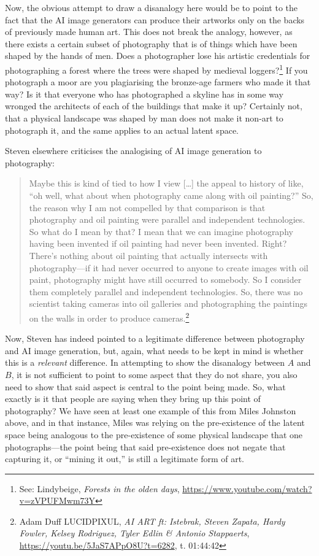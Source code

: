 \documentclass[11pt]{article}
\begin{document}
Now, the obvious attempt to draw a disanalogy here would be to point to the fact that the AI image generators can produce their artworks only on the backs of previously made human art. This does not break the analogy, however, as there exists a certain subset of photography that is of things which have been shaped by the hands of men. Does a photographer lose his artistic credentials for photographing a forest where the trees were shaped by medieval loggers?\footnote{See: Lindybeige, \emph{Forests in the olden days}, \url{https://www.youtube.com/watch?v=zVPUFMwm73Y}} If you photograph a moor are you plagiarising the bronze-age farmers who made it that way? Is it that everyone who has photographed a skyline has in some way wronged the architects of each of the buildings that make it up? Certainly not, that a physical landscape was shaped by man does not make it non-art to photograph it, and the same applies to an actual latent space.

Steven elsewhere criticises the analogising of AI image generation to photography:
\begin{quote}
Maybe this is kind of tied to how I view [\ldots{}] the appeal to history of like, ``oh well, what about when photography came along with oil painting?'' So, the reason why I am not compelled by that comparison is that photography and oil painting were parallel and independent technologies. So what do I mean by that? I mean that we can imagine photography having been invented if oil painting had never been invented. Right? There's nothing about oil painting that actually intersects with photography---if it had never occurred to anyone to create images with oil paint, photography might have still occurred to somebody. So I consider them completely parallel and independent technologies. So, there was no scientist taking cameras into oil galleries and photographing the paintings on the walls in order to produce cameras.\footnote{Adam Duff LUCIDPIXUL, \emph{AI ART ft: Istebrak, Steven Zapata, Hardy Fowler, Kelsey Rodriguez, Tyler Edlin \& Antonio Stappaerts}, \url{https://youtu.be/5JaS7APpO8U?t=6282}, t. 01:44:42}
\end{quote}

Now, Steven has indeed pointed to a legitimate difference between photography and AI image generation, but, again, what needs to be kept in mind is whether this is a \emph{relevant} difference. In attempting to show the disanalogy between \(A\) and \(B\), it is not sufficient to point to some aspect that they do not share, you also need to show that said aspect is central to the point being made. So, what exactly is it that people are saying when they bring up this point of photography? We have seen at least one example of this from Miles Johnston above, and in that instance, Miles was relying on the pre-existence of the latent space being analogous to the pre-existence of some physical landscape that one photographs---the point being that said pre-existence does not negate that capturing it, or ``mining it out,'' is still a legitimate form of art.
\end{document}
